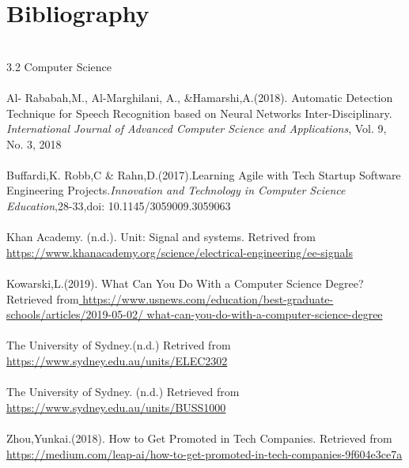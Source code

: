 \documentclass{article}
\begin{document}
	    
	\section{Bibliography}
	\\
	3.2 Computer Science\\
	\\
	Al- Rababah,M., Al-Marghilani, A., &Hamarshi,A.(2018). Automatic Detection Technique for Speech Recognition based on Neural Networks Inter-Disciplinary. \textit{International Journal of Advanced Computer Science and Applications}, Vol. 9, No. 3, 2018 \\
	\\
	Buffardi,K. Robb,C & Rahn,D.(2017).Learning Agile with Tech Startup Software Engineering Projects.\textit{Innovation and Technology in Computer Science Education},28-33,doi: 10.1145/3059009.3059063\\
	\\
	Khan Academy. (n.d.). Unit: Signal and systems. Retrived from\url{ https://www.khanacademy.org/science/electrical-engineering/ee-signals}\\
	\\
	Kowarski,L.(2019). What Can You Do With a Computer Science Degree? Retrieved from\url{ https://www.usnews.com/education/best-graduate-schools/articles/2019-05-02/
	what-can-you-do-with-a-computer-science-degree}\\
	\\
	The University of Sydney.(n.d.) Retrived from \url{
    https://www.sydney.edu.au/units/ELEC2302}\\
    \\
    The University of Sydney. (n.d.) Retrieved from \url{
    https://www.sydney.edu.au/units/BUSS1000}\\
    \\
    Zhou,Yunkai.(2018). How to Get Promoted in Tech Companies. Retrieved from \url{ https://medium.com/leap-ai/how-to-get-promoted-in-tech-companies-9f604e3ce7a}
    \\
    
\end{document}
